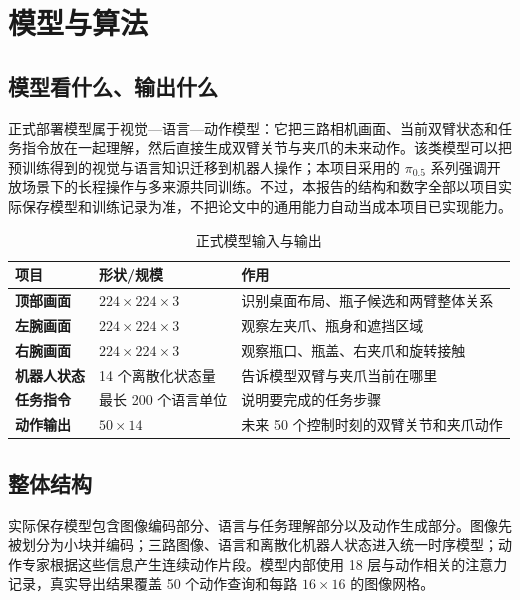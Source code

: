 \chapter{模型与算法}

\section{模型看什么、输出什么}

正式部署模型属于视觉—语言—动作模型：它把三路相机画面、当前双臂状态和任务指令放在一起理解，然后直接生成双臂关节与夹爪的未来动作。该类模型可以把预训练得到的视觉与语言知识迁移到机器人操作；本项目采用的 $\pi_{0.5}$ 系列强调开放场景下的长程操作与多来源共同训练\cite{pi05_2025}。不过，本报告的结构和数字全部以项目实际保存模型和训练记录为准，不把论文中的通用能力自动当成本项目已实现能力。


\begin{table}[H]
\centering
\caption{正式模型输入与输出}
\begin{tabularx}{\textwidth}{>{\bfseries}p{31mm}p{34mm}X}
\toprule
项目 & 形状/规模 & 作用\\
\midrule
顶部画面 & $224\times224\times3$ & 识别桌面布局、瓶子候选和两臂整体关系\\
左腕画面 & $224\times224\times3$ & 观察左夹爪、瓶身和遮挡区域\\
右腕画面 & $224\times224\times3$ & 观察瓶口、瓶盖、右夹爪和旋转接触\\
机器人状态 & 14 个离散化状态量 & 告诉模型双臂与夹爪当前在哪里\\
任务指令 & 最长 200 个语言单位 & 说明要完成的任务步骤\\
动作输出 & $50\times14$ & 未来 50 个控制时刻的双臂关节和夹爪动作\\
\bottomrule
\end{tabularx}
\end{table}

\section{整体结构}

实际保存模型包含图像编码部分、语言与任务理解部分以及动作生成部分。图像先被划分为小块并编码；三路图像、语言和离散化机器人状态进入统一时序模型；动作专家根据这些信息产生连续动作片段。模型内部使用 18 层与动作相关的注意力记录，真实导出结果覆盖 50 个动作查询和每路 $16\times16$ 的图像网格。

